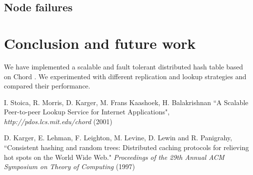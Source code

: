 \documentclass{sig-alternate-10pt}
\begin{document}
\subsection{Node failures}

\section{Conclusion and future work}
We have implemented a scalable and fault tolerant distributed hash table based on Chord \cite{chord}. We experimented with different replication and lookup strategies and compared their performance. 


%
\vspace{-0.1cm}

\begin{thebibliography}{00}
\vspace{-0.1cm}

I. Stoica, R. Morris, D. Karger, M. Frans Kaashoek, H. Balakrishnan
``A Scalable Peer-to-peer Lookup Service for Internet Applications",
{\em http://pdos.lcs.mit.edu/chord} (2001)

D. Karger, E. Lehman, F. Leighton, M. Levine, D. Lewin and R. Panigrahy,
``Consistent hashing and random trees: Distributed caching protocols for relieving hot spots on the World Wide Web."
{\em Proceedings of the 29th Annual ACM Symposium on Theory of Computing} (1997)

%
%
\end{thebibliography}
\end{document}
